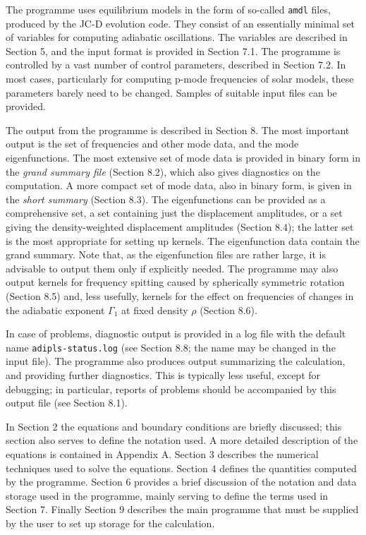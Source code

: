 The programme uses equilibrium models in the form
of so-called {\tt amdl} files, produced by the JC-D evolution code.
They consist of an essentially minimal set of variables
for computing adiabatic oscillations.
The variables are described in Section 5, and the input format
is provided in Section 7.1.
The programme is controlled by a vast number of control parameters,
described in Section 7.2. 
In most cases, particularly for computing p-mode frequencies
of solar models, these parameters barely need to be changed.
Samples of suitable input files can be provided.

The output from the programme is described in Section 8.
The most important output is the set of frequencies and other
mode data, and the mode eigenfunctions.
The most extensive set of mode data is provided in
binary form in the {\it grand summary file} (Section 8.2),
which also gives diagnostics on the computation.
A more compact set of mode data, also in binary form,
is given in the {\it short summary} (Section 8.3).
The eigenfunctions can be provided as a comprehensive set,
a set containing just the displacement amplitudes,
or a set giving the density-weighted displacement amplitudes
(Section 8.4); the latter set is the most appropriate for
setting up kernels.
The eigenfunction data contain the grand summary.
Note that, as the eigenfunction files are rather large,
it is advisable to output them only if explicitly needed.
The programme may also output kernels for frequency
spitting caused by spherically symmetric rotation (Section 8.5)
and, less usefully, kernels for the effect on frequencies of
changes in the adiabatic exponent $\Gamma_1$ at fixed density $\rho$
(Section 8.6).

In case of problems, diagnostic output is provided in a 
log file with the default name {\tt adipls-status.log}
(see Section 8.8; the name may be changed in the input file).
The programme also produces output summarizing the calculation,
and providing further diagnostics.
This is typically less useful, except for debugging;
in particular, reports of problems should be accompanied
by this output file (see Section 8.1).

In Section 2 the equations and boundary conditions are briefly 
discussed; this section also serves to define the notation used.
A more detailed description of the equations is contained in
Appendix A. Section 3 describes the numerical techniques used to
solve the equations. Section 4 defines the quantities computed by
the programme. 
Section 6 provides a brief 
discussion of the notation and data storage used in the programme,
mainly serving to define the terms used in Section 7.
Finally Section 9 describes the main programme that must
be supplied by the user to set up storage for the calculation. 

